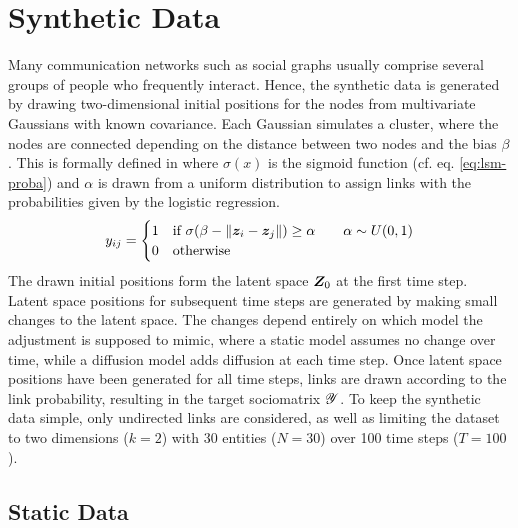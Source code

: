 \section{Synthetic Data}

Many communication networks such as social graphs usually comprise several groups of people who frequently interact. Hence, the synthetic data is generated by drawing two-dimensional initial positions for the nodes from multivariate Gaussians with known covariance. 
Each Gaussian simulates a cluster, where the nodes are connected depending on the distance between two nodes and the bias $\beta$. This is formally defined in  where $\sigma(x)$ is the sigmoid function (cf. eq. \ref{eq:lsm-proba}) and $\alpha$ is drawn from a uniform distribution to assign links with the probabilities given by the logistic regression.
\begin{equation}\label{eq:synth-link}
    \sub(y) = 
    \begin{cases}
        1 & \text{if } \sigma(\beta - \Vert\z_i - \z_j\Vert) \geq \alpha \qquad \alpha\sim U(0,1) \\
        0 & \text{otherwise}
    \end{cases}
\end{equation}
The drawn initial positions form the latent space $\bm{Z}_0$ at the first time step. Latent space positions for subsequent time steps are generated by making small changes to the latent space. The changes depend entirely on which model the adjustment is supposed to mimic, where a static model assumes no change over time, while a diffusion model adds diffusion at each time step. Once latent space positions have been generated for all time steps, links are drawn according to the link probability, resulting in the target sociomatrix $\bm{\mathscr{Y}}$. To keep the synthetic data simple, only undirected links are considered, as well as limiting the dataset to two dimensions ($k=2$) with 30 entities ($N=30$) over 100 time steps ($T=100$).

\subsection{Static Data}

